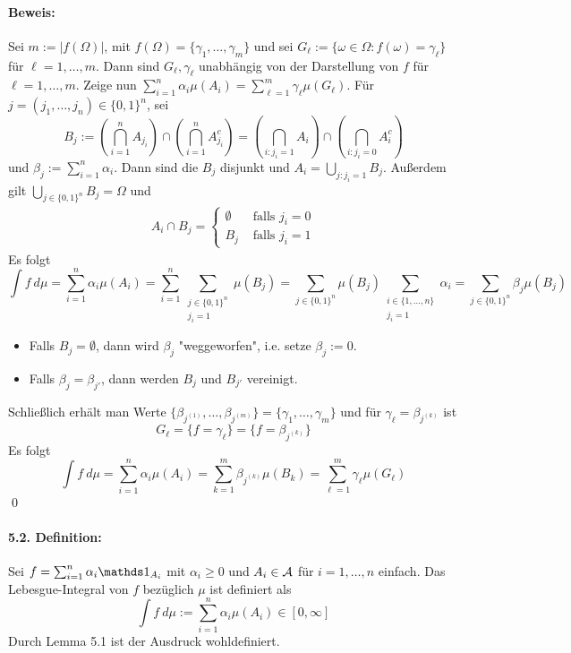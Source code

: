 \paragraph{Beweis:}Sei $m:=|f(\Omega)|$, mit $f(\Omega)=\{\gamma_1,\hdots,\gamma_m\}$ und sei $G_\ell:=\{\omega\in\Omega:f(\omega)=\gamma_\ell\}$ f\"ur $\ell=1,\hdots,m$. Dann sind $G_\ell,\gamma_\ell$ unabh\"angig von der Darstellung von $f$ f\"ur $\ell=1,\hdots,m$. Zeige nun $\sum_{i=1}^n \alpha_i\mu(A_i)=\sum_{\ell=1}^m\gamma_\ell\mu(G_\ell)$. \newline
F\"ur $j=(j_1,\dots,j_n)\in\{0,1\}^n$, sei 
$$B_j:=\left(\bigcap_{i=1}^nA_{j_i}\right)\cap\left(\bigcap_{i=1}^nA_{j_i}^c\right)=\left(\bigcap_{i:j_i=1}A_i\right)\cap\left(\bigcap_{i:j_i=0}A_i^c\right)$$
und $\beta_j:=\sum_{i=1}^n\alpha_i$. Dann sind die $B_j$ disjunkt und $A_i=\bigcup_{j:j_i=1}B_j$. Au\ss{}erdem gilt $\bigcup_{j\in\{0,1\}^n}B_j=\Omega$ und 
\begin{align*}
    A_i\cap B_j=
    \begin{cases}
        \emptyset&\text{ falls }j_i=0\\
        B_j&\text{ falls }j_i=1
    \end{cases}
\end{align*}
Es folgt 
$$\int f\ d\mu=\sum_{i=1}^n\alpha_i\mu(A_i)=\sum_{i=1}^n\sum_{\substack{j\in\{0,1\}^n\\ j_i=1}}\mu(B_j)=\sum_{j\in\{0,1\}^n}\mu(B_j)\sum_{\substack{i\in\{1,\hdots,n\}\\ j_i=1}}\alpha_i=\sum_{j\in\{0,1\}^n}\beta_j\mu(B_j)$$
\begin{itemize}
    \item Falls $B_j=\emptyset$, dann wird $\beta_j$ "weggeworfen", i.e. setze $\beta_j:=0$.
    \item Falls $\beta_j=\beta_{j'}$, dann werden $B_j$ und $B_{j'}$ vereinigt.
\end{itemize}
Schlie\ss{}lich erh\"alt man Werte $\{\beta_{j^{(1)}},\hdots,\beta_{j^{(m)}}\}=\{\gamma_1,\hdots,\gamma_m\}$ und f\"ur $\gamma_\ell=\beta_{j^{(k)}}$ ist 
$$G_\ell=\{f=\gamma_\ell\}=\{f=\beta_{j^{(k)}}\}$$
 Es folgt
 $$\int f\ d\mu=\sum_{i=1}^n\alpha_i\mu(A_i)=\sum_{k=1}^m\beta_{j^{(k)}}\mu(B_k)=\sum_{\ell=1}^m\gamma_\ell\mu(G_\ell)$$
 \qed
 
 \paragraph{5.2. Definition:}Sei $f=\sum_{i=1}^n\alpha_i\ind{A_i}$ mit $\alpha_i\geq0$ und $A_i\in\mathcal{A}$ f\"ur $i=1,\hdots,n$ einfach. Das Lebesgue-Integral von $f$ bez\"uglich $\mu$ ist definiert als
 $$\int f\ d\mu:=\sum_{i=1}^n\alpha_i\mu(A_i)\in[0,\infty]$$
 Durch Lemma 5.1 ist der Ausdruck wohldefiniert.
 
